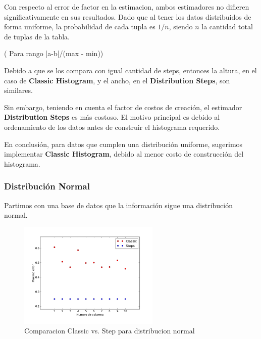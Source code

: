 \documentclass[10pt, a4paper,english,spanish,hidelinks]{article}
\begin{document}
Con respecto al error de factor en la estimacion, ambos estimadores no difieren
significativamente en sus resultados. Dado que al tener los datos distribuidos de forma
uniforme, la probabilidad de cada tupla es $1/n$, siendo $n$ la cantidad total de tuplas de la tabla.

( Para rango |a-b|/(max - min))


Debido a que se los compara con igual cantidad de steps, entonces la altura, en el caso de
\textbf{Classic Histogram}, y el ancho, en el \textbf{Distribution Steps}, son similares.

Sin embargo, teniendo en cuenta el factor de costos de creación, el estimador
\textbf{Distribution Steps} es más costoso. El motivo principal es debido al ordenamiento
de los datos antes de construir el histograma requerido.

En conclusión, para datos que cumplen una distribución uniforme, sugerimos implementar
\textbf{Classic Histogram}, debido al menor costo de construcción del histograma.


\subsubsection{Distribución Normal}

Partimos con una base de datos que la información sigue una distribución normal.

\begin{figure}[h!]
  \centering
  \includegraphics[width=0.6\textwidth]{./imagenes/ejb1_normal.png}
  \caption{Comparacion Classic vs. Step para distribucion normal}
\end{figure}
\end{document}
